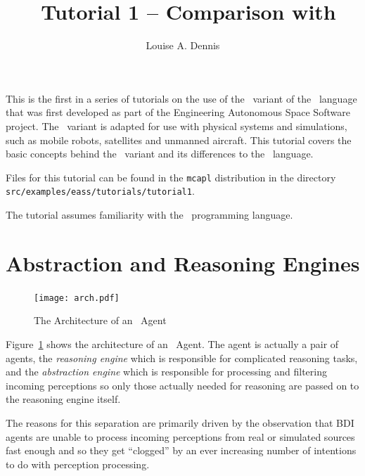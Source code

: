 \documentclass[a4]{article}
\author{Louise A. Dennis}
\title{\eass\ Tutorial 1 -- Comparison with \gwendolen}
\begin{document}
\maketitle
This is the first in a series of tutorials on the use of the \eass\ variant of the \gwendolen\ language that was first developed as part of the Engineering Autonomous Space Software project.  The \eass\ variant is adapted for use with physical systems and simulations, such as mobile robots, satellites and unmanned aircraft.  This tutorial covers the basic concepts behind the \eass\ variant and its differences to the \gwendolen\ language.  

Files for this tutorial can be found in the \texttt{mcapl} distribution in the directory \texttt{src/examples/eass/tutorials/tutorial1}.

The tutorial assumes familiarity with the \gwendolen\ programming language.

\section{Abstraction and Reasoning Engines}

\begin{figure}[htb]
\texttt{[image: arch.pdf]}
\caption{The Architecture of an \eass\ Agent}
\label{fig:arch}
\end{figure}
Figure~\ref{fig:arch} shows the architecture of an \eass\ Agent.  The agent is actually a pair of agents, the \emph{reasoning engine} which is responsible for complicated reasoning tasks, and the \emph{abstraction engine} which is responsible for processing and filtering incoming perceptions so only those actually needed for reasoning are passed on to the reasoning engine itself.

The reasons for this separation are primarily driven by the observation that BDI agents are unable to process incoming perceptions from real or simulated sources fast enough and so they get ``clogged'' by an ever increasing number of intentions to do with perception processing.  
\end{document}
